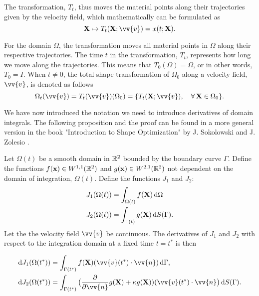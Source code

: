 The transformation, $T_t$, thus moves the material points along their trajectories given by the velocity field, which mathematically can be formulated as
\begin{equation}
    \mathbf{X} \mapsto T_t(\mathbf{X}; \vv{v}) = x(t; \mathbf{X}).
    \label{eq:euler-lagrange}
\end{equation}

For the domain $\Omega$, the transformation moves all material points in $\Omega$ along their respective trajectories. The time $t$ in the transformation, $T_t$, represents how long we move along the trajectories. This means that $T_0(\Omega) = \Omega$, or in other words, $T_0 = I$. When $t\neq 0$, the total shape transformation of $\Omega_0$ along a velocity field, $\vv{v}$, is denoted as follows
\begin{equation}
    \Omega_t(\vv{v}) = T_t(\vv{v})(\Omega_0) = \{T_t(\mathbf{X}; \vv{v}), \quad \forall \, \mathbf{X} \in \Omega_0 \} .
    \label{eq:tot-shape-trans}
\end{equation}

We have now introduced the notation we need to introduce derivatives of domain integrals. The following proposition and the proof can be found in a more general version in the book "Introduction to Shape Optimization" by J. Sokolowski and J. Zolesio \cite{zolesio-MR1215733}. 

\begin{proposition}
Let $\Omega(t)$ be a smooth domain in $\mathbb{R}^2$ bounded by the boundary curve $\Gamma$. Define the functions $f(\mathbf{x})\in W^{1, 1}(\mathbb{R}^2)$ and $g(\mathbf{x})\in W^{2, 1}(\mathbb{R}^2)$ not dependent on the domain of integration, $\Omega(t)$. Define the functions $J_1$ and $J_2$:
\begin{align*}
    J_1(\Omega(t)) &= \int_{\Omega(t)} f(\mathbf{X}) \mathop{}\!\mathrm{d} \Omega \\
    J_2(\Omega(t)) &= \int_{\Gamma(t)} g(\mathbf{X}) \mathop{}\!\mathrm{d} S(\Gamma).
\end{align*}
Let the the velocity field $\vv{v}$ be continuous. The derivatives of $J_1$ and $J_2$ with respect to the integration domain at a fixed time $t=t^*$ is then

\begin{align}
    \diff J_1(\Omega(t^*)) &= \int_{\Gamma(t^*)}f(\mathbf{X}) (\vv{v}(t^*)\cdot \vv{n}) \diff \Gamma, \label{eq:J1-der}\\
    \diff J_2(\Omega(t^*)) &= \int_{\Gamma(t^*)} \big(\frac{\partial}{\partial \vv{n}}g(\mathbf{X}) + \kappa g(\mathbf{X}) ) (\vv{v}(t^*)\cdot \vv{n} \big) \diff S(\Gamma). \label{eq:J2-der}
\end{align}
\label{prop:shape-derivative}
\end{proposition}

